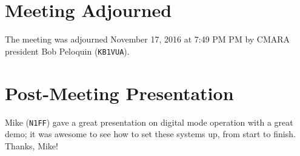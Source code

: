 \documentclass[10pt,letterpaper]{article}
\begin{document}
\section{Meeting Adjourned}
The meeting was adjourned November 17, 2016 at 7:49 PM PM by CMARA president Bob Peloquin (\texttt{KB1VUA}).

\section{Post-Meeting Presentation}
Mike (\texttt{N1FF}) gave a great presentation on digital mode operation with a great demo; it was awesome to see how to set these systems up, from start to finish. Thanks, Mike!
\end{document}
